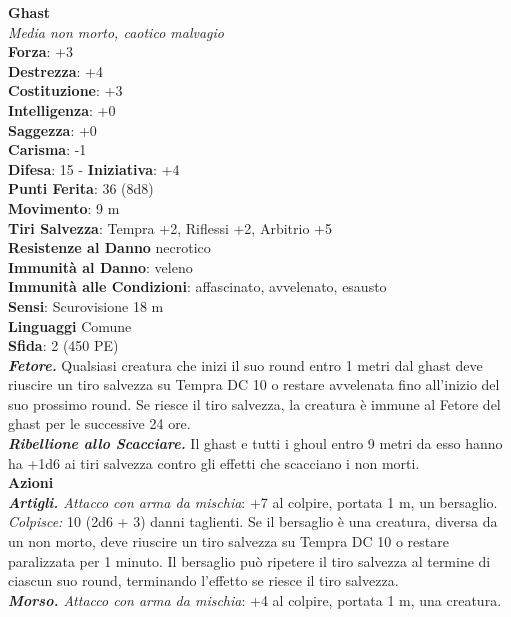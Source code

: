 \begin{multicols}{2}
\medskip\textbf{Ghast}\\
\emph{Media non morto, caotico malvagio}\\
\textbf{Forza}: +3\\
\textbf{Destrezza}: +4\\
\textbf{Costituzione}: +3\\
\textbf{Intelligenza}: +0\\
\textbf{Saggezza}: +0\\
\textbf{Carisma}: -1\\
\textbf{Difesa}: 15 - \textbf{Iniziativa}: +4\\
\textbf{Punti Ferita}: 36 (8d8)\\
\textbf{Movimento}: 9 m\\
\textbf{Tiri Salvezza}: Tempra +2, Riflessi +2, Arbitrio +5\\
\textbf{Resistenze al Danno} necrotico\\
\textbf{Immunità al Danno}: veleno\\
\textbf{Immunità alle Condizioni}: affascinato, avvelenato, esausto\\
\textbf{Sensi}: Scurovisione 18 m \\
\textbf{Linguaggi} Comune\\
\textbf{Sfida}: 2 (450 PE)\smallskip\\
\emph{\textbf{Fetore.}} Qualsiasi creatura che inizi il suo round entro 1 metri dal ghast deve riuscire un tiro salvezza su Tempra DC 10 o restare avvelenata fino all'inizio del suo prossimo round. Se riesce il tiro  salvezza, la creatura è immune al Fetore del ghast per le successive 24 ore.\\
\emph{\textbf{Ribellione allo Scacciare.}} Il ghast e tutti i ghoul entro 9 metri da esso hanno ha +1d6 ai tiri salvezza contro gli effetti che scacciano i non morti. \\
\smallskip\textbf{Azioni}\\
\emph{\textbf{Artigli.} Attacco con arma da mischia}: +7 al colpire, portata 1 m, un bersaglio.\\
\emph{Colpisce:} 10 (2d6 + 3) danni taglienti. Se il bersaglio è una creatura, diversa da un non morto, deve riuscire un tiro salvezza su Tempra DC 10 o restare paralizzata per 1 minuto. Il bersaglio può ripetere il tiro salvezza al termine di ciascun suo round, terminando l'effetto se riesce il tiro salvezza.\\
\emph{\textbf{Morso.} Attacco con arma da mischia}: +4 al colpire, portata 1 m, una creatura.\\

\end{multicols}
